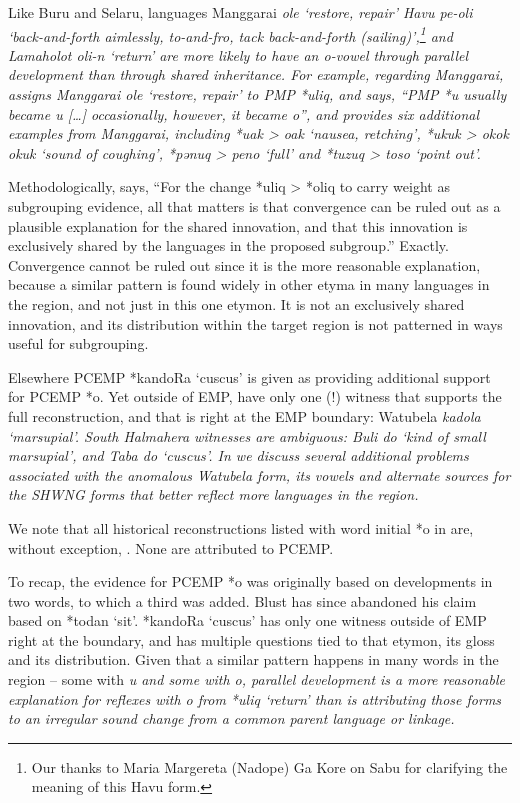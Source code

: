 Like Buru
and Selaru,  languages Manggarai \it{ole} ‘restore,
repair’ Havu \it{pe-oli} ‘back-and-forth aimlessly,
to-and-fro, tack back-and-forth (sailing)’,\footnote{
		Our thanks to Maria Margereta (Nadope) Ga Kore on Sabu for clarifying the
		meaning of this Havu form.} 
and Lamaholot \it{oli-n} ‘return’ are more likely to have an
\it{o}-vowel through parallel development than through shared inheritance.
For example, regarding Manggarai,
\citet[89]{Blust2008} assigns Manggarai \it{ole} ‘restore,
repair’ to PMP *uliq,
and says, “PMP *u usually became \it{u} [{\ldots}] occasionally,
however, it became \it{o}”, and provides six additional examples
from Manggarai, including *uak > \it{oak} ‘nausea,
retching’, *ukuk > \it{okok {\tl} okuk} ‘sound of coughing’,
*pənuq > \it{peno} ‘full’
and *tuzuq > \it{toso} ‘point out’.

Methodologically, \citet[53]{Blust2009} says, “For the change
*uliq > *oliq to carry weight as subgrouping evidence,
all that matters is that convergence can be ruled out as a plausible
explanation for the shared innovation,
and that this innovation is exclusively shared by the languages
in the proposed subgroup.” Exactly.
Convergence cannot be ruled out since it is the more reasonable
explanation, because a similar pattern is found widely in other etyma in many
languages in the region,
and not just in this one etymon.
It is not an exclusively shared innovation,
and its distribution within the target region is not patterned
in ways useful for subgrouping.

Elsewhere \citep[42]{Blust2009} PCEMP *kandoRa ‘cuscus’ is given
as providing additional support for PCEMP *o.
Yet outside of EMP,
\citet{BlustTrussel2020} have only one (!) witness that supports
the full reconstruction, and that is right at the EMP boundary:
Watubela \it{kadola} ‘marsupial’.
South Halmahera witnesses are ambiguous: Buli \it{do} ‘kind of
small marsupial’, and Taba \it{do} ‘cuscus’.
In  we discuss several additional problems associated
with the anomalous Watubela form,
its vowels and alternate sources for the SHWNG forms that better
reflect more languages in the region.

We note that all historical reconstructions listed with word
initial *o in \citet{BlustTrussel2020} are, without exception, .
None are attributed to PCEMP.

To recap, the evidence for PCEMP *o was originally based on developments
in two words, to which a third was added.
Blust has since abandoned his claim based on *todan ‘sit’.
*kandoRa ‘cuscus’ has only one witness outside of EMP right at
the boundary, and has multiple questions tied to that etymon,
its gloss and its distribution.
Given that a similar pattern happens in many words in the region -- some
with \it{u} and some with \it{o},
parallel development is a more reasonable explanation for reflexes
with \it{o} from *uliq ‘return’ than is attributing those forms
to an irregular sound change from a common parent language or linkage.